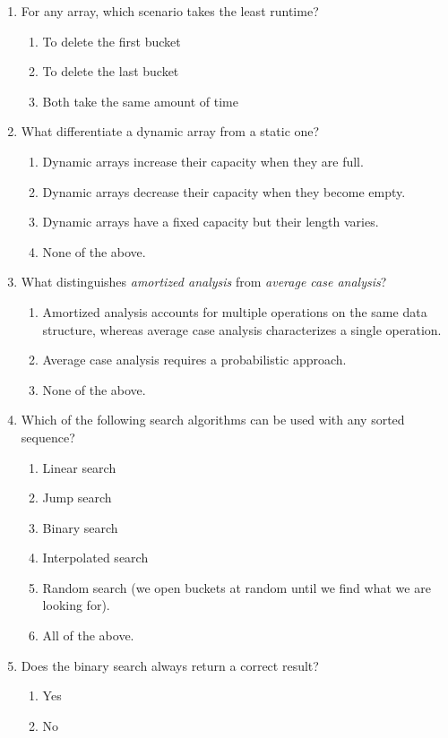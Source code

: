 \documentclass[11pt]{article}
\begin{document}
\begin{enumerate}
\item For any array, which scenario takes the least runtime?
\begin{enumerate}
\item To delete the first bucket
\item To delete the last bucket
\item Both take the same amount of time
\end{enumerate}

\item What differentiate a dynamic array from a static one?
\begin{enumerate}
\item Dynamic arrays increase their capacity when they are full.
\item Dynamic arrays decrease their capacity when they become empty.
\item Dynamic arrays have a fixed capacity but their length varies.
\item None of the above.
\end{enumerate}

\item What distinguishes \emph{amortized analysis} from \emph{average
case analysis}?
\begin{enumerate}
\item Amortized analysis accounts for multiple operations on the same
data structure, whereas average case analysis characterizes a
single operation.
\item Average case analysis requires a probabilistic approach.
\item None of the above.
\end{enumerate}

\item Which of the following search algorithms can be used with any sorted
sequence?
\begin{enumerate}
\item Linear search
\item Jump search
\item Binary search
\item Interpolated search
\item Random search (we open buckets at random until we find what we are
looking for).
\item All of the above.
\end{enumerate}

\item Does the binary search always return a correct result?
\begin{enumerate}
\item Yes
\item No
\end{enumerate}


\end{enumerate}
\end{document}
